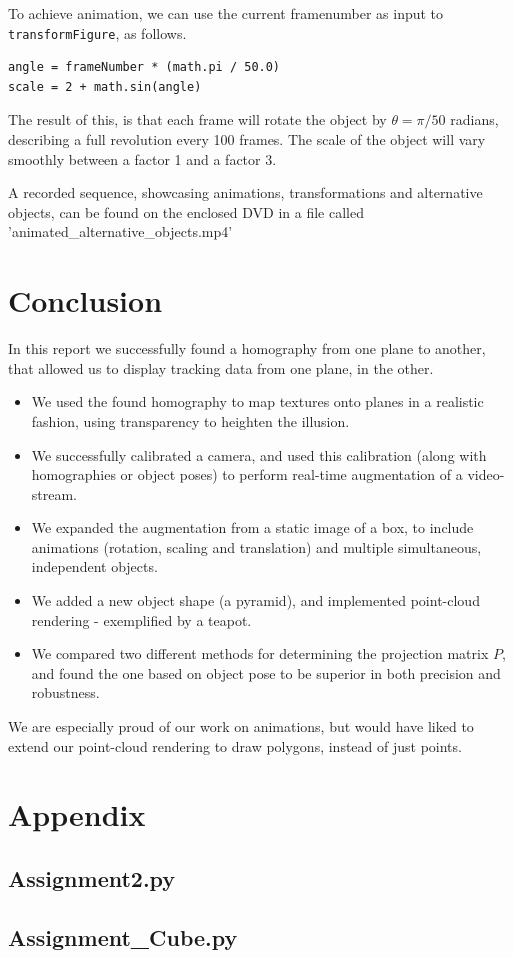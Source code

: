 \documentclass[a4paper,11pt]{article}
\begin{document}
To achieve animation, we can use the current framenumber as input to \texttt{transformFigure}, as follows.

\begin{lstlisting}
angle = frameNumber * (math.pi / 50.0)
scale = 2 + math.sin(angle)
\end{lstlisting}

The result of this, is that each frame will rotate the object by $\theta = \pi / 50$ radians, describing a full revolution every 100 frames. The scale of the object will vary smoothly between a factor 1 and a factor 3.

A recorded sequence, showcasing animations, transformations and alternative objects, can be found on the enclosed DVD in a file called 'animated\_alternative\_objects.mp4' 

\section{Conclusion}
In this report we successfully found a homography from one plane to another, that allowed us to display tracking data from one plane, in the other.
\begin{itemize}
\item
We used the found homography to map textures onto planes in a realistic fashion, using transparency to heighten the illusion.
\item
We successfully calibrated a camera, and used this calibration (along with homographies or object poses) to perform real-time augmentation of a video-stream.
\item
We expanded the augmentation from a static image of a box, to include animations (rotation, scaling and translation) and multiple simultaneous, independent objects.
\item
We added a new object shape (a pyramid), and implemented point-cloud rendering - exemplified by a teapot.
\item
We compared two different methods for determining the projection matrix $P$, and found the one based on object pose to be superior in both precision and robustness.
\end{itemize}
We are especially proud of our work on animations, but would have liked to extend our point-cloud rendering to draw polygons, instead of just points.

\newpage
\section*{Appendix}
\subsection*{Assignment2.py}

\subsection*{Assignment\_Cube.py}

\end{document}
